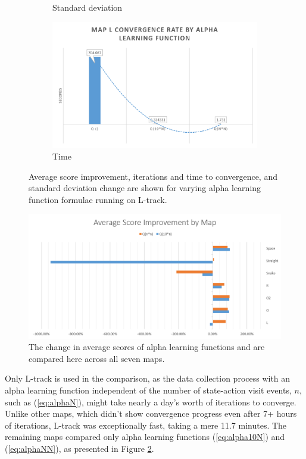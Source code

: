 \documentclass[12pt, letter]{article}
\newlength{\remaining}
\begin{document}
\begin{figure}[h!]
\begin{subfigure}[b]{0.48\textwidth}
        \caption{Standard deviation}
    \end{subfigure}
    \begin{subfigure}[b]{0.48\textwidth}
        \includegraphics[width=1\textwidth]{img/L_Alpha/Time}
        \caption{Time}
    \end{subfigure}
    \caption{Average score improvement, iterations and time to convergence, and standard deviation change are shown for varying alpha learning function formulae running on L-track.}
    \label{fig:lalphaTimeIterAvgScoreStDev}
\end{figure}
\clearpage

\begin{figure} 
  \centering
  \includegraphics[width=.76\textwidth]{img/avgScore_Maps}
  \caption{The change in average scores of alpha learning functions  and  are compared here across all seven maps.}
  \label{fig:mapsAvgScore}
\end{figure}

Only L-track is used in the comparison, as the data collection process with an alpha learning function independent of the number of state-action visit events, $n$, such as (\ref{eq:alphaN}), might take nearly a day's worth of iterations to converge.  Unlike other maps, which didn't show convergence progress even after 7+ hours of iterations, L-track was exceptionally fast, taking a mere 11.7 minutes.  The remaining maps compared only alpha learning functions (\ref{eq:alpha10N}) and (\ref{eq:alphaNN}), as presented in Figure \ref{fig:mapsAvgScore}.
\end{document}
